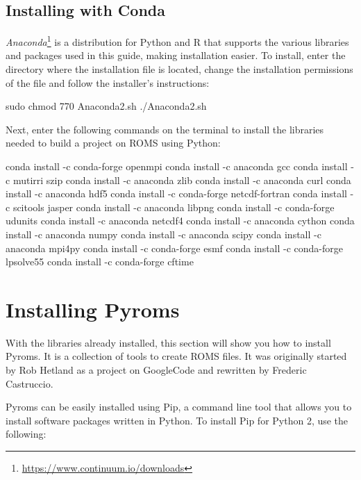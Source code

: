 \subsection{Installing with Conda}\label{condasec}
\bigskip
\noindent \textcolor{bleu_cite}{\textit{Anaconda}\footnote{\textcolor{bleu_cite}{\href{https://www.continuum.io/downloads}{https://www.continuum.io/downloads}}}}
is a distribution for Python and R that supports the various libraries and packages used in this guide, 
making installation easier. To install, enter the directory where the installation file is located, change the installation permissions of the file and 
follow the installer's instructions:
\bigskip

\begin{bashcode}
 sudo chmod 770 Anaconda2.sh
 ./Anaconda2.sh
\end{bashcode}
\bigskip

\noindent Next, enter the following commands on the terminal to install the libraries needed to build a project on ROMS using Python:
\bigskip

\begin{bashcode}
conda install -c conda-forge openmpi
conda install -c anaconda gcc
conda install -c mutirri szip
conda install -c anaconda zlib
conda install -c anaconda curl
conda install -c anaconda hdf5
conda install -c conda-forge netcdf-fortran
conda install -c scitools jasper
conda install -c anaconda libpng
conda install -c conda-forge udunits
conda install -c anaconda netcdf4
conda install -c anaconda cython
conda install -c anaconda numpy
conda install -c anaconda scipy
conda install -c anaconda mpi4py
conda install -c conda-forge esmf
conda install -c conda-forge lpsolve55 
conda install -c conda-forge cftime
\end{bashcode}
\bigskip

\section{Installing Pyroms}
\bigskip

\noindent With the libraries already installed, this section will show you how to install Pyroms. 
It is a collection of tools to create ROMS files. It was originally started by Rob Hetland as a project on GoogleCode and 
rewritten by Frederic Castruccio.
\bigskip

\noindent Pyroms can be easily installed using Pip, a command line tool that allows you to install software packages written in Python.
To install Pip for Python 2, use the following:
\bigskip

